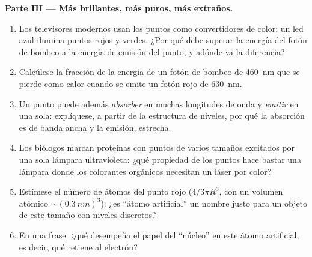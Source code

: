 \begin{problem}
\medskip\noindent\textbf{Parte III --- Más brillantes, más puros, más extraños.}
\begin{enumerate}[resume]
  \item Los televisores modernos usan los puntos como convertidores de
        color: un led azul ilumina puntos rojos y verdes. ¿Por qué debe
        superar la energía del fotón de bombeo a la energía de emisión del
        punto, y adónde va la diferencia?
  \item Calcúlese la fracción de la energía de un fotón de bombeo de
        \qty{460}{nm} que se pierde como calor cuando se emite un fotón
        rojo de \qty{630}{nm}.
  \item Un punto puede además \emph{absorber} en muchas longitudes de onda
        y \emph{emitir} en una sola: explíquese, a partir de la estructura de
        niveles, por qué la absorción es de banda ancha y la emisión,
        estrecha.
  \item Los biólogos marcan proteínas con puntos de varios tamaños
        excitados por una sola lámpara ultravioleta: ¿qué propiedad de los
        puntos hace bastar una lámpara donde los colorantes orgánicos
        necesitan un láser por color?
  \item Estímese el número de átomos del punto rojo ($4/3\pi R^3$, con un
        volumen atómico $\sim(\qty{0.3}{nm})^3$): ¿es ``átomo artificial''
        un nombre justo para un objeto de este tamaño con niveles
        discretos?
  \item En una frase: ¿qué desempeña el papel del ``núcleo'' en este átomo
        artificial, es decir, qué retiene al electrón?
\end{enumerate}


\end{problem}
